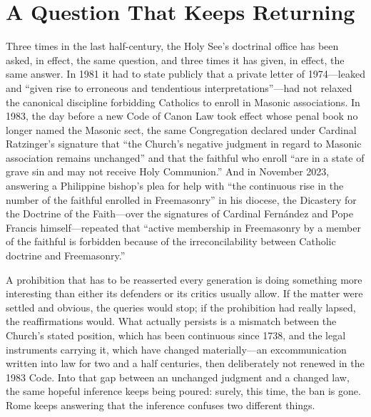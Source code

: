 \section{A Question That Keeps Returning}

Three times in the last half-century, the Holy See's doctrinal office has been asked, in effect, the same question, and three times it has given, in effect, the same answer. In 1981 it had to state publicly that a private letter of 1974---leaked and ``given rise to erroneous and tendentious interpretations''---had not relaxed the canonical discipline forbidding Catholics to enroll in Masonic associations. In 1983, the day before a new Code of Canon Law took effect whose penal book no longer named the Masonic sect, the same Congregation declared under Cardinal Ratzinger's signature that ``the Church's negative judgment in regard to Masonic association remains unchanged'' and that the faithful who enroll ``are in a state of grave sin and may not receive Holy Communion.'' And in November 2023, answering a Philippine bishop's plea for help with ``the continuous rise in the number of the faithful enrolled in Freemasonry'' in his diocese, the Dicastery for the Doctrine of the Faith---over the signatures of Cardinal Fern\'andez and Pope Francis himself---repeated that ``active membership in Freemasonry by a member of the faithful is forbidden because of the irreconcilability between Catholic doctrine and Freemasonry.''

A prohibition that has to be reasserted every generation is doing something more interesting than either its defenders or its critics usually allow. If the matter were settled and obvious, the queries would stop; if the prohibition had really lapsed, the reaffirmations would. What actually persists is a mismatch between the Church's stated position, which has been continuous since 1738, and the legal instruments carrying it, which have changed materially---an excommunication written into law for two and a half centuries, then deliberately not renewed in the 1983 Code. Into that gap between an unchanged judgment and a changed law, the same hopeful inference keeps being poured: surely, this time, the ban is gone. Rome keeps answering that the inference confuses two different things.

